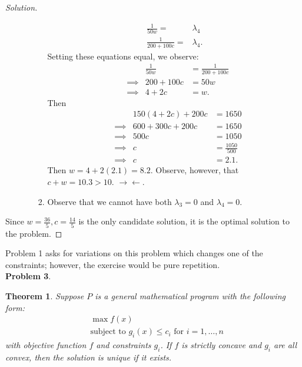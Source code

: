 \documentclass[12pt]{article}
\newtheorem{thm}{Theorem}
\theoremstyle{definition}
\theoremstyle{remark}
\def\la{\lambda}
\begin{document}
\begin{proof}[Solution]
\begin{enumerate}
\begin{enumerate}
\begin{enumerate}
\begin{align*}
        \frac{1}{50w} =& \la_4 \\
        \frac{1}{200+100c} =& \la_4.
      \end{align*}
      Setting these equations equal, we observe:
      \begin{align*}
        &           & \frac{1}{50w} &= \frac{1}{200+100c} \\
        & \implies  & 200+100c &= 50w \\
        & \implies  & 4+2c &= w.
      \end{align*}
      Then
      \begin{align*}
        &           & 150(4+2c) + 200c &= 1650 \\
        & \implies  & 600 + 300c + 200c &= 1650 \\
        & \implies  & 500c &= 1050 \\
        & \implies  & c &= \frac{1050}{500} \\
        & \implies  & c &= 2.1.
      \end{align*}
      Then $w = 4+2(2.1) = 8.2$. Observe, however, that $c+w = 10.3 > 10$. $\rightarrow \leftarrow$.
      \item Observe that we cannot have both $\la_3 = 0$ and $\la_4 = 0$.
    \end{enumerate}
  \end{enumerate}
\end{enumerate}
Since $w = \frac{36}{5}, c = \frac{14}{5}$ is the only candidate solution, it is the optimal solution to the problem.
\end{proof}
Problem 1 asks for variations on this problem which changes one of the constraints; however, the exercise would be pure repetition.
\\
\textbf{Problem 3}. \begin{thm} Suppose $P$ is a general mathematical program with the following form:
\begin{align*}
  &\max f(x) \\
  &\text{subject to } g_i(x) \leq c_i \text{ for } i = 1,\ldots,n
\end{align*}
with objective function $f$ and constraints $g_i$. If $f$ is strictly concave and $g_i$ are all convex, then the solution is unique if it exists.
\end{thm}
\end{document}
